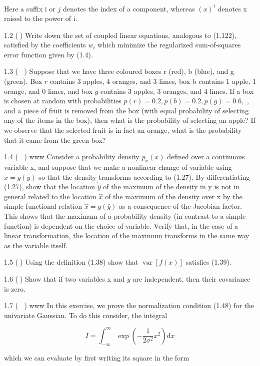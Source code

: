 \documentclass[
  10
]{article}
\begin{document}
Here a suffix i or \(j\) denotes the index of a component, whereas
\(( x ) ^ { i }\) denotes x raised to the power of i.

1.2 () Write down the set of coupled linear equations, analogous to
(1.122), satisfied by the coefficients \(w _ { i }\) which minimize the
regularized sum-of-squares error function given by (1.4).

1.3 ( ) Suppose that we have three coloured boxes r (red), b (blue), and
g (green). Box \(r\) contains 3 apples, 4 oranges, and 3 limes, box b
contains 1 apple, 1 orange, and 0 limes, and box \(g\) contains 3
apples, 3 oranges, and 4 limes. If a box is chosen at random with
probabilities \(p ( r ) = 0 . 2 , p ( b ) = 0 . 2 , p ( g ) = 0 . 6 ,\)
, and a piece of fruit is removed from the box (with equal probability
of selecting any of the items in the box), then what is the probability
of selecting an apple? If we observe that the selected fruit is in fact
an orange, what is the probability that it came from the green box?

1.4 ( ) www Consider a probability density \(p _ { x } ( x )\) defined
over a continuous variable x, and suppose that we make a nonlinear
change of variable using \(x = g ( y )\) so that the density transforms
according to (1.27). By differentiating (1.27), show that the location
\(\dot { \widehat { y } }\) of the maximum of the density in y is not in
general related to the location \(\widehat { x }\) of the maximum of the
density over x by the simple functional relation
\({ \widehat { x } } = g ( { \widehat { y } } )\) as a consequence of
the Jacobian factor. This shows that the maximum of a probability
density (in contrast to a simple function) is dependent on the choice of
variable. Verify that, in the case of a linear transformation, the
location of the maximum transforms in the same way as the variable
itself.

1.5 () Using the definition (1.38) show that
\(\operatorname { v a r } [ f ( x ) ]\) satisfies (1.39).

1.6 () Show that if two variables x and \(y\) are independent, then
their covariance is zero.

1.7 ( ) www In this exercise, we prove the normalization condition
(1.48) for the univariate Gaussian. To do this consider, the integral

\[
I = \int_ {- \infty} ^ {\infty} \exp \left(- \frac {1}{2 \sigma^ {2}} x ^ {2}\right) \mathrm{d} x\tag{1.124}
\]

which we can evaluate by first writing its square in the form
\end{document}
